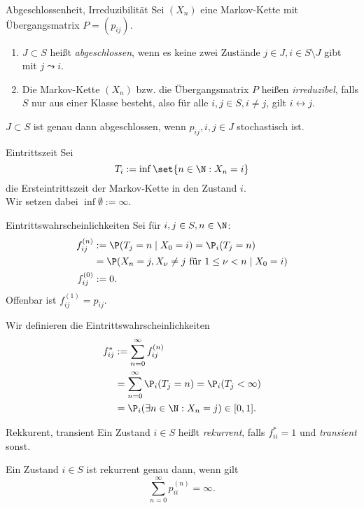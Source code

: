 \begin{karte}{Abgeschlossenheit, Irreduzibilität}
    Sei \((X_n)\) eine Markov-Kette mit Übergangsmatrix \(P = (p_{ij})\).
    \begin{enumerate}
        \item \(J\subset S\) heißt \textit{abgeschlossen}, wenn es keine zwei Zustände 
        \(j\in J, i \in S \setminus J\) gibt mit \(j\leadsto i\).
        \item Die Markov-Kette \((X_n)\) bzw. die Übergangsmatrix \(P\) 
        heißen \textit{irreduzibel}, falls \(S\) nur aus einer Klasse besteht, 
        also für alle \(i,j\in S, i\neq j\), gilt \(i \leftrightarrow j\).
    \end{enumerate}

    \(J\subset S\) ist genau dann abgeschlossen, wenn \(p_{ij}, i,j\in J\) 
    stochastisch ist.
\end{karte}

\begin{karte}{Eintrittszeit}
    Sei 
    \[ T_i := \inf \set{n\in \N: X_n = i} \]
    die Ersteintrittszeit der Markov-Kette in den Zustand \(i\). \\
    Wir setzen dabei \(\inf \emptyset := \infty\).
\end{karte}

\begin{karte}{Eintrittswahrscheinlichkeiten}
    Sei für \(i,j\in S, n\in\N\): 
    \begin{align*}
        f_{ij}^{(n)} &:= \P(T_j = n \;|\; X_0 = i) = \P_i(T_j = n) \\
        &= \P(X_n = j, X_\nu \neq j \text{ für } 1 \leq \nu < n \;|\; X_0 = i) \\
        f_{ij}^{(0)} &:= 0.
    \end{align*}
    Offenbar ist \(f_{ij}^{(1)} = p_{ij}\).

    Wir definieren die Eintrittswahrscheinlichkeiten 
    \begin{align*}
        f_{ij}^* &:= \sum_{n=0}^\infty f_{ij}^{(n)} \\
        &= \sum_{n=0}^\infty \P_i(T_j = n) = \P_i(T_j < \infty) \\
        &= \P_i(\exists n\in \N: X_n = j) \in [0,1].
    \end{align*}
\end{karte}

\begin{karte}{Rekkurent, transient}
    Ein Zustand \(i\in S\) heißt \textit{rekurrent}, falls 
    \(f_{ii}^* = 1\) und \textit{transient} sonst.

    Ein Zustand \(i\in S\) ist rekurrent genau dann, wenn gilt 
    \[ \sum_{n=0}^\infty p_{ii}^{(n)} = \infty. \]
\end{karte}

